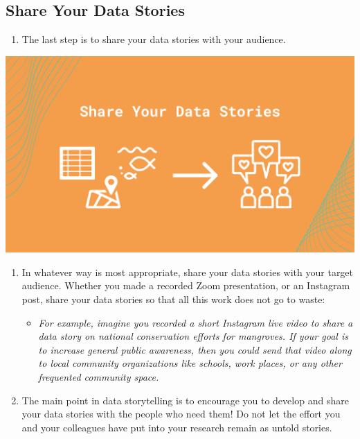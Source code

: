 \documentclass[
]{book}
\providecommand{\tightlist}{%
  \setlength{\itemsep}{0pt}\setlength{\parskip}{0pt}}
\begin{document}
\hypertarget{share-your-data-stories}{%
\subsection{Share Your Data Stories}\label{share-your-data-stories}}

\begin{enumerate}
\def\labelenumi{\arabic{enumi}.}
\tightlist
\item
  The last step is to share your data stories with your audience.
\end{enumerate}

\includegraphics{images/Data-Storytelling-4.png}

\begin{enumerate}
\def\labelenumi{\arabic{enumi}.}
\setcounter{enumi}{1}
\tightlist
\item
  In whatever way is most appropriate, share your data stories with your target audience. Whether you made a recorded Zoom presentation, or an Instagram post, share your data stories so that all this work does not go to waste:

  \begin{itemize}
  \tightlist
  \item
    \emph{For example, imagine you recorded a short Instagram live video to share a data story on national conservation efforts for mangroves. If your goal is to increase general public awareness, then you could send that video along to local community organizations like schools, work places, or any other frequented community space.}
  \end{itemize}
\item
  The main point in data storytelling is to encourage you to develop and share your data stories with the people who need them! Do not let the effort you and your colleagues have put into your research remain as untold stories.
\end{enumerate}
\end{document}
